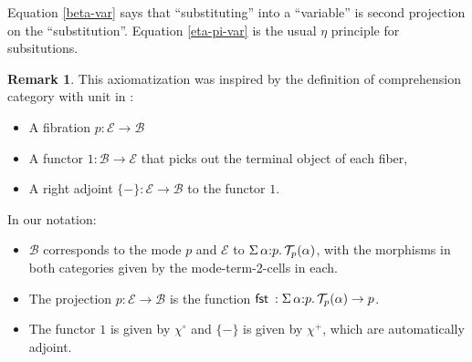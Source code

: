 \documentclass[10pt]{article}
\theoremstyle{definition}
\newtheorem{remark}{Remark}
\newcommand\dsd[1]{\ensuremath{\mathsf{#1}}}
\newcommand\El[2]{\mathcal{T}_{#1}(#2)}
\newcommand{\app}[2]{\ensuremath{#1 \: #2}}
\newcommand{\sigmacl}[3]{\ensuremath{\textnormal{$\Sigma$}\,#1{:}#2.\,#3}}
\newcommand{\fst}[1]{\app{\dsd{fst}}{#1}}
\begin{document}
Equation \eqref{beta-var} says that ``substituting'' into a ``variable'' is second projection on the ``substitution''.  Equation \eqref{eta-pi-var} is the usual $\eta$ principle for subsitutions.

\begin{remark}
This axiomatization was inspired by the definition of comprehension
category with unit in \cite{ahman+16fibered}:
\begin{itemize}
\item A fibration $p : \mathcal{E} \to \mathcal{B}$
\item A functor $1 : \mathcal{B} \to \mathcal{E}$ that picks out the terminal object of each fiber,
\item A right adjoint $\{-\} : \mathcal{E} \to \mathcal{B}$ to the functor $1$.
\end{itemize}
In our notation:
\begin{itemize}
\item $\mathcal{B}$ corresponds to the mode $p$ and $\mathcal{E}$ to $\sigmacl{\alpha}{p}{\El{p}{\alpha}}$, with the morphisms in both categories given by the mode-term-2-cells in each.

\item The projection $p : \mathcal{E} \to \mathcal{B}$ is the function $\fst : \sigmacl{\alpha}{p}{\El{p}{\alpha}} \to p$. 

\item The functor $1$ is given by $\chi^\circ$ and $\{-\}$ is given by $\chi^+$, which are automatically adjoint.
\end{itemize}
\end{remark}
\end{document}
